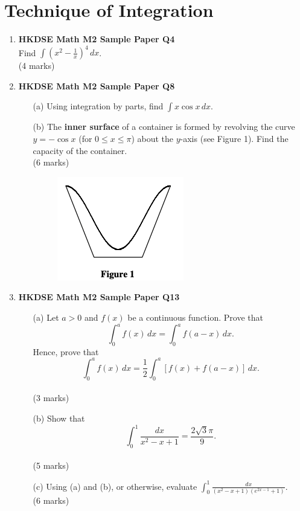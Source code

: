 \documentclass{report}
\begin{document}
\chapter{Technique of Integration}
\begin{enumerate}
	\item \textbf{HKDSE Math M2 Sample Paper Q4}\\
	Find $\displaystyle\int\left(x^2-\frac{1}{x}\right)^4 \,dx$. \\(4 marks)

	\item \textbf{HKDSE Math M2 Sample Paper Q8}
	\begin{enumerate}
		\item [(a)]Using integration by parts, find $\displaystyle\int x\cos{x}\,dx$. 
		\item [(b)]The \textbf{inner surface} of a container is formed by revolving the curve $y = -\cos{x}$ (for $0 \leq x \leq \pi$) about the $y$-axis (see Figure 1). Find the capacity of the container. \\(6 marks)
		\begin{figure}[H]
			\centering
			\includegraphics[width = .3\linewidth]{SPFigure1}
		\end{figure}
	\end{enumerate}

	\item \textbf{HKDSE Math M2 Sample Paper Q13}
	\begin{enumerate}
		\item[(a)]Let $a > 0$ and $f(x)$ be a continuous function. Prove that $$\displaystyle\int_{0}^a f(x) \,dx = \int_{0}^a f(a-x) \,dx.$$
		Hence, prove that $$\displaystyle\int_{0}^a f(x) \,dx = \frac{1}{2}\int_{0}^a [f(x) + f(a-x)] \,dx.$$ \\(3 marks)
		\item[(b)]Show that $$\displaystyle\int_0^1 \frac{dx}{x^2-x+1} = \frac{2\sqrt{3}\pi}{9}.$$ \\(5 marks)
		\item[(c)]Using (a) and (b), or otherwise, evaluate $\displaystyle\int_0^1 \frac{dx}{(x^2-x+1)(e^{2x-1}+1)}$. \\(6 marks)
	\end{enumerate}


\end{enumerate}
\end{document}
